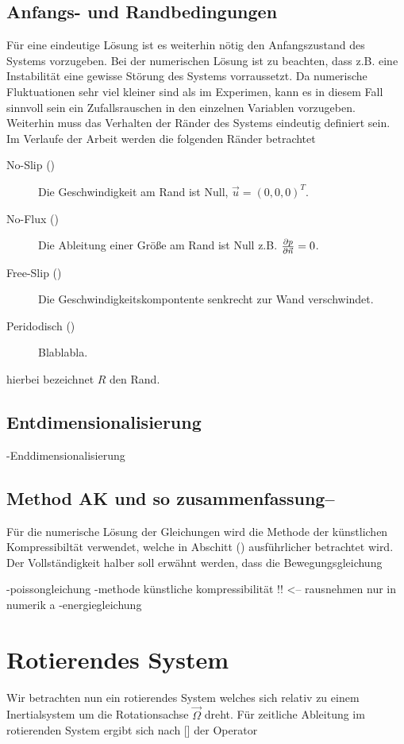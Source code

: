 \subsection{Anfangs- und Randbedingungen}
Für eine eindeutige Lösung ist es weiterhin nötig den Anfangszustand des Systems vorzugeben.
Bei der numerischen Lösung ist zu beachten, dass z.B. eine Instabilität eine gewisse Störung des Systems vorraussetzt.
Da numerische Fluktuationen sehr viel kleiner sind als im Experimen, kann es in diesem Fall sinnvoll sein
ein Zufallsrauschen in den einzelnen Variablen vorzugeben.
Weiterhin muss das Verhalten der Ränder des Systems eindeutig definiert sein.
Im Verlaufe der Arbeit werden die folgenden Ränder betrachtet
\begin{description}
    \item[No-Slip ()] Die Geschwindigkeit am Rand ist Null, $\vec{u} = (0, 0, 0)^T$.
    \item[No-Flux ()] Die Ableitung einer Größe am Rand ist Null z.B. $\pdn[p]{\vec{n}} = 0$.
    \item[Free-Slip ()] Die Geschwindigkeitskompontente senkrecht zur Wand verschwindet.
    \item[Peridodisch ()] Blablabla.
\end{description}
hierbei bezeichnet $R$ den Rand.

\subsection{Entdimensionalisierung}

-Enddimensionalisierung

\subsection{Method AK  und so zusammenfassung--}


Für die numerische Lösung der Gleichungen wird die Methode der künstlichen Kompressibiltät verwendet, welche in Abschitt ()
ausführlicher betrachtet wird. Der Vollständigkeit halber soll erwähnt werden, dass die Bewegungsgleichung






-poissongleichung
-methode künstliche kompressibilität !! <-- rausnehmen nur in numerik
a
-energiegleichung


\section{Rotierendes System}
Wir betrachten nun ein rotierendes System welches  sich relativ zu einem Inertialsystem um die Rotationsachse $\vec{\Omega}$ dreht.
Für zeitliche Ableitung im rotierenden System ergibt sich nach [] der Operator


